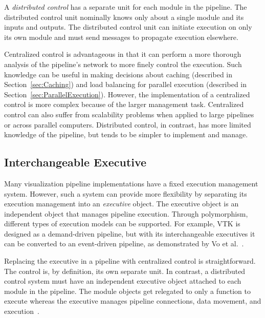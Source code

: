\documentclass[journal,twocolumn,10pt,letterpaper,twoside]{IEEEtran}
\newcommand*{\lcite}[1]{~\cite{#1}}
\newcommand*{\scite}[1]{~\cite{#1}}
\newcommand*{\keyterm}[1]{\emph{#1}}
\newcommand{\etal}{et al.}
\begin{document}
A \keyterm{distributed control} has a separate unit for each module in
the pipeline.  The distributed control unit nominally knows only about a
single module and its inputs and outputs.  The distributed control unit
can initiate execution on only its own module and must send messages to
propagate execution elsewhere.

Centralized control is advantageous in that it can perform a more thorough
analysis of the pipeline's network to more finely control the execution.
Such knowledge can be useful in making decisions about caching (described
in Section~\ref{sec:Caching}) and load balancing for parallel execution
(described in Section~\ref{sec:ParallelExecution}).  However, the
implementation of a centralized control is more complex because of the
larger management task.  Centralized control can also suffer from
scalability problems when applied to large pipelines or across parallel
computers.  Distributed control, in contrast, has more limited knowledge of
the pipeline, but tends to be simpler to implement and manage.

\subsection{Interchangeable Executive}
\label{sec:InterchangeableExecutive}

Many visualization pipeline implementations have a fixed execution
management system.  However, such a system can provide more flexibility by
separating its execution management into an \keyterm{executive} object.  The
executive object is an independent object that manages pipeline execution.
Through polymorphism, different types of execution models can be
supported.  For example, VTK is designed as a demand-driven pipeline, but
with its interchangeable executives it can be converted to an event-driven
pipeline, as demonstrated by Vo \etal\scite{Vo2010}.

Replacing the executive in a pipeline with centralized control is
straightforward.  The control is, by definition, its own separate unit.  In
contrast, a distributed control system must have an independent executive
object attached to each module in the pipeline.  The module objects
get relegated to only a function to execute whereas the executive manages
pipeline connections, data movement, and execution\lcite{VTKUsersGuide}.
\end{document}
